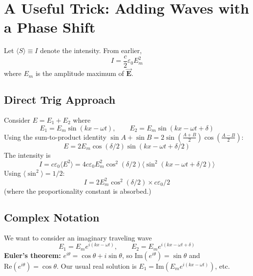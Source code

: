 \documentclass[11pt]{report}
\newcommand{\vbf}[1]{\vec{\mathbf{#1}}}
\begin{document}
\section{A Useful Trick: Adding Waves with a Phase Shift}

Let $\langle S\rangle \equiv I$ denote the intensity. From earlier,
\begin{equation}
I = \frac{c}{2}\varepsilon_0 E_m^2
\end{equation}
where $E_m$ is the amplitude maximum of $\vbf{E}$.

\subsection*{Direct Trig Approach}

Consider $E = E_1 + E_2$ where
\begin{equation}
E_1 = E_m\sin(kx - \omega t), \qquad E_2 = E_m\sin(kx - \omega t + \delta)
\end{equation}
Using the sum-to-product identity $\sin A + \sin B = 2\sin\!\left(\tfrac{A+B}{2}\right)\cos\!\left(\tfrac{A-B}{2}\right)$:
\begin{equation}
E = 2 E_m \cos(\delta/2) \sin(kx - \omega t + \delta/2)
\end{equation}
The intensity is
\begin{equation}
I = c\varepsilon_0 \langle E^2\rangle = 4 c\varepsilon_0 E_m^2 \cos^2(\delta/2) \langle \sin^2(kx-\omega t + \delta/2)\rangle
\end{equation}
Using $\langle\sin^2\rangle = 1/2$:
\begin{equation}
\boxed{I = 2 E_m^2 \cos^2(\delta/2) \times c\varepsilon_0/2}
\end{equation}
(where the proportionality constant is absorbed.)

\subsection*{Complex Notation}

We want to consider an imaginary traveling wave
\begin{equation}
E_1 = E_m e^{i(kx-\omega t)}, \qquad E_2 = E_m e^{i(kx-\omega t + \delta)}
\end{equation}
\textbf{Euler's theorem:} $e^{i\theta} = \cos\theta + i\sin\theta$, so $\mathrm{Im}(e^{i\theta}) = \sin\theta$ and $\mathrm{Re}(e^{i\theta}) = \cos\theta$. Our usual real solution is $E_1 = \mathrm{Im}(E_m e^{i(kx-\omega t)})$, etc.
\end{document}
